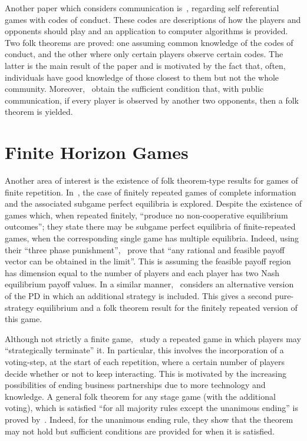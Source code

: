 Another paper which considers communication is~\cite{Block2016}, regarding self
referential games with codes of conduct. These codes are descriptions of how the
players and opponents should play and an application to computer algorithms is
provided. Two folk theorems are proved: one assuming common knowledge of the
codes of conduct, and the other where only certain players observe certain
codes. The latter is the main result of the paper and is motivated by the fact
that, often, individuals have good knowledge of those closest to them but not
the whole community. Moreover,~\cite{Block2016} obtain the sufficient condition
that, with public communication, if every player is observed by another two
opponents, then a folk theorem is yielded.


\section{Finite Horizon Games}\label{sec:Finite_Horizon_Games}
Another area of interest is the existence of folk theorem-type results for games
of finite repetition. In~\cite{Benoit_1985}, the case of
finitely repeated games of complete information and the associated subgame
perfect equilibria is explored. Despite the existence of games which, when
repeated finitely, ``produce no non-cooperative equilibrium outcomes''; they
state there may be subgame perfect equilibria of finite-repeated games, when the
corresponding single game has multiple equilibria. Indeed, using their ``three
phase punishment'',~\cite{Benoit_1985} prove that ``any rational and feasible
payoff vector can be obtained in the limit''. This is assuming the feasible
payoff region has dimension equal to the number of players and each player has
two Nash equilibrium payoff values. In a similar manner,~\cite{ANGELOVA2011}
considers an alternative version of the PD in which an additional strategy is
included. This gives a second pure-strategy equilibrium and a folk theorem
result for the finitely repeated version of this game. 

Although not strictly a finite game,~\cite{Fujiwara-Greve2018} study a repeated
game in which players may ``strategically terminate'' it. In particular, this
involves the incorporation of a voting-step, at the start of each repetition,
where a certain number of players decide whether or not to keep interacting.
This is motivated by the increasing possibilities of ending business
partnerships due to more technology and knowledge. A general folk theorem for
any stage game (with the additional voting), which is satisfied ``for all
majority rules except the unanimous ending'' is proved by~\cite{Fujiwara-Greve2018}. Indeed, for the unanimous ending rule, they
show that the theorem may not hold but sufficient conditions are
provided for when it is satisfied.


